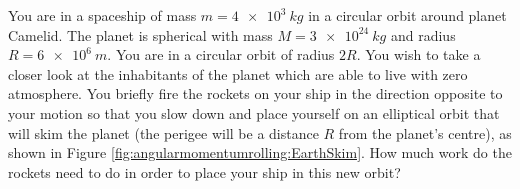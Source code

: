 \question You are in a spaceship of mass $m=\SI{4e3}{kg}$ in a circular orbit around planet Camelid. The planet is spherical with mass $M=\SI{3e24}{kg}$ and radius $R=\SI{6e6}{m}$. You are in a circular orbit of radius $2R$. You wish to take a closer look at the inhabitants of the planet which are able to live with zero atmosphere. You briefly fire the rockets on your ship in the direction opposite to your motion so that you slow down and place yourself on an elliptical orbit that will skim the planet (the perigee will be a distance $R$ from the planet's centre), as shown in Figure \ref{fig:angularmomentumrolling:EarthSkim}. How much work do the rockets need to do in order to place your ship in this new orbit?

